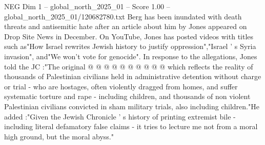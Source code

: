 \begin{textsample}{NEG Dim 1 – global\_north\_2025\_01 – Score 1.00 – global\_north\_2025\_01/120682780.txt}
Berg has been inundated with death threats and antisemitic hate after an article about him by Jones appeared on Drop Site News in December.
On YouTube, Jones has posted videos with titles such as"How Israel rewrites Jewish history to justify oppression","Israel ' s Syria invasion", and"We won't vote for genocide".
In response to the allegations, Jones told the JC :"The original @ @ @ @ @ @ @ @ @ @ which reflects the reality of thousands of Palestinian civilians held in administrative detention without charge or trial - who are hostages, often violently dragged from homes, and suffer systematic torture and rape - including children, and thousands of non violent Palestinian civilians convicted in sham military trials, also including children."He added :"Given the Jewish Chronicle ' s history of printing extremist bile - including literal defamatory false claims - it tries to lecture me not from a moral high ground, but the moral abyss."

\end{textsample}
